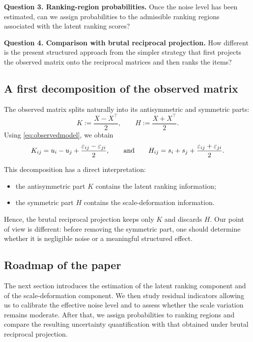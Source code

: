 \documentclass[11pt]{amsart}
\theoremstyle{definition}
\theoremstyle{plain}
\numberwithin{equation}{section}
\begin{document}
\medskip

\noindent\textbf{Question 3. Ranking-region probabilities.}
Once the noise level has been estimated, can we assign probabilities to the admissible ranking regions associated with the latent ranking scores?

\medskip

\noindent\textbf{Question 4. Comparison with brutal reciprocal projection.}
How different is the present structured approach from the simpler strategy that first projects the observed matrix onto the reciprocal matrices and then ranks the items?

\subsection{A first decomposition of the observed matrix}

The observed matrix splits naturally into its antisymmetric and symmetric parts:
\[
K:=\frac{X-X^\top}{2},
\qquad
H:=\frac{X+X^\top}{2}.
\]
Using \eqref{eq:observedmodel}, we obtain
\[
K_{ij}=u_i-u_j+\frac{\varepsilon_{ij}-\varepsilon_{ji}}{2},
\qquad 
\hbox{and}
\qquad
H_{ij}=s_i+s_j+\frac{\varepsilon_{ij}+\varepsilon_{ji}}{2}.
\]

This decomposition has a direct interpretation:
\begin{itemize}
\item the antisymmetric part $K$ contains the latent ranking information;
\item the symmetric part $H$ contains the scale-deformation information.
\end{itemize}

Hence, the brutal reciprocal projection keeps only $K$ and discards $H$. Our point of view is different: before removing the symmetric part, one should determine whether it is negligible noise or a meaningful structured effect.

\subsection{Roadmap of the paper}

The next section introduces the estimation of the latent ranking component and of the scale-deformation component. We then study residual indicators allowing us to calibrate the effective noise level and to assess whether the scale variation remains moderate. After that, we assign probabilities to ranking regions and compare the resulting uncertainty quantification with that obtained under brutal reciprocal projection.
\end{document}
